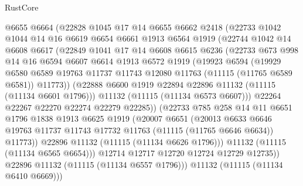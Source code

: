 \begin{lexlean}{RustCore}
\begin{coremodule}
          @6655
          @6664
          (@22828
            @1045
            @17
            @14
            @6655
            @6662
            @2418
            (@22733
              @1042
              @1044
              @14
              @16
              @6619
              @6654
              @6661
              @1913
              @6564
              @1919
              (@22744
                @1042
                @14
                @6608
                @6617
                (@22849
                  @1041
                  @17
                  @14
                  @6608
                  @6615
                  @6236
                  (@22733
                    @673
                    @998
                    @14
                    @16
                    @6594
                    @6607
                    @6614
                    @1913
                    @6572
                    @1919
                    (@19923
                      @6594
                      (@19929
                        @6580
                        @6589
                        @19763
                        @11737
                        @11743
                        @12080
                        @11763
                        (@11115 (@11765 @6589 @6581))
                        @11773))
                    (@22888 @6600 @1919 @22894 @22896 @11132 (@11115 (@11134 @6601 @1796)))
                    @11132
                    (@11115 (@11134 @6573 @6607)))
                  @22264
                  @22267
                  @22270
                  @22274
                  @22279
                  @22285))
              (@22733
                @785
                @258
                @14
                @11
                @6651
                @1796
                @1838
                @1913
                @6625
                @1919
                (@20007
                  @6651
                  (@20013
                    @6633
                    @6646
                    @19763
                    @11737
                    @11743
                    @17732
                    @11763
                    (@11115 (@11765 @6646 @6634))
                    @11773))
                @22896
                @11132
                (@11115 (@11134 @6626 @1796)))
              @11132
              (@11115 (@11134 @6565 @6654)))
            @12714
            @12717
            @12720
            @12724
            @12729
            @12735))
        @22896
        @11132
        (@11115 (@11134 @6557 @1796)))
      @11132
      (@11115 (@11134 @6410 @6669)))

\end{coremodule}
\end{lexlean}
